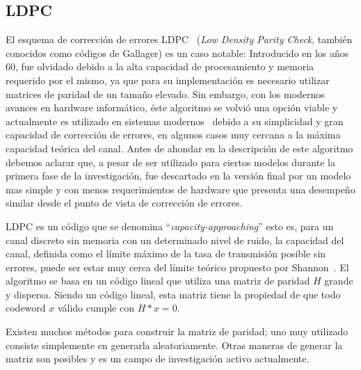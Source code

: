 \subsection{LDPC}
\label{defLDPC}
El esquema de corrección de errores LDPC~\cite{gallagerpress} (\textit{Low Density Parity Check}, también conocidos como códigos de Gallager) es un caso notable: Introducido en los años 60, fue olvidado debido a la alta capacidad de procesamiento y memoria requerido por el mismo, ya que para su implementación es necesario utilizar matrices de paridad de un tamaño elevado. Sin embargo, con los modernos avances en hardware informático, éste algoritmo se volvió una opción viable y actualmente es utilizado en sistemas modernos~\cite{brack2007low} debido a su simplicidad y gran capacidad de corrección de errores, en algunos casos muy cercana a la máxima capacidad teórica del canal.
Antes de ahondar en la descripción de este algoritmo debemos aclarar que, a pesar de ser utilizado para ciertos modelos durante la primera fase de la investigación, fue descartado en la versión final por un modelo mas simple y con menos requerimientos de hardware que presenta una desempeño similar desde el punto de vista de corrección de errores.

LDPC es un código que se denomina ``\textit{capacity-approaching}'' esto es, para un canal discreto sin memoria con un determinado nivel de ruido, la capacidad del canal, definida como el límite máximo de la tasa de transmisión posible sin errores, puede ser estar muy cerca del límite teórico propuesto por Shannon~\cite{shannon48}.
El algoritmo se basa en un código lineal que utiliza una matriz de paridad $H$ grande y dispersa. Siendo un código lineal, esta matriz tiene la propiedad de que todo codeword $x$ válido cumple con $H*x=0$. 

Existen muchos métodos para construir la matriz de paridad; uno muy utilizado consiste simplemente en generarla aleatoriamente. Otras maneras de generar la matriz son posibles y es un campo de investigación activo actualmente.


